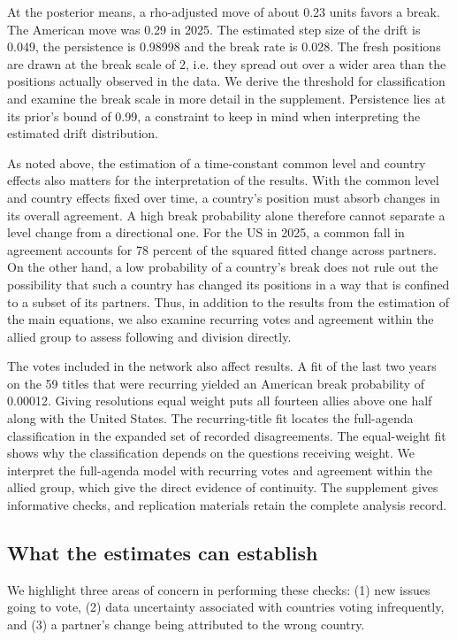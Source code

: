 \documentclass[12pt,authoryear]{elsarticle}
\begin{document}
At the posterior means, a rho-adjusted move of about 0.23 units favors a break. The American move was 0.29 in 2025. The estimated step size of the drift is 0.049, the persistence is 0.98998 and the break rate is 0.028. The fresh positions are drawn at the break scale of 2, i.e. they spread out over a wider area than the positions actually observed in the data. We derive the threshold for classification and examine the break scale in more detail in the supplement. Persistence lies at its prior's bound of 0.99, a constraint to keep in mind when interpreting the estimated drift distribution.

As noted above, the estimation of a time-constant common level and country effects also matters for the interpretation of the results. With the common level and country effects fixed over time, a country's position must absorb changes in its overall agreement. A high break probability alone therefore cannot separate a level change from a directional one. For the US in 2025, a common fall in agreement accounts for 78 percent of the squared fitted change across partners. On the other hand, a low probability of a country's break does not rule out the possibility that such a country has changed its positions in a way that is confined to a subset of its partners. Thus, in addition to the results from the estimation of the main equations, we also examine recurring votes and agreement within the allied group to assess following and division directly.

The votes included in the network also affect results. A fit of the last two years on the 59 titles that were recurring yielded an American break probability of 0.00012. Giving resolutions equal weight puts all fourteen allies above one half along with the United States. The recurring-title fit locates the full-agenda classification in the expanded set of recorded disagreements. The equal-weight fit shows why the classification depends on the questions receiving weight. We interpret the full-agenda model with recurring votes and agreement within the allied group, which give the direct evidence of continuity. The supplement gives informative checks, and replication materials retain the complete analysis record.

\subsection{What the estimates can establish}

We highlight three areas of concern in performing these checks: (1) new issues going to vote, (2) data uncertainty associated with countries voting infrequently, and (3) a partner's change being attributed to the wrong country.
\end{document}
